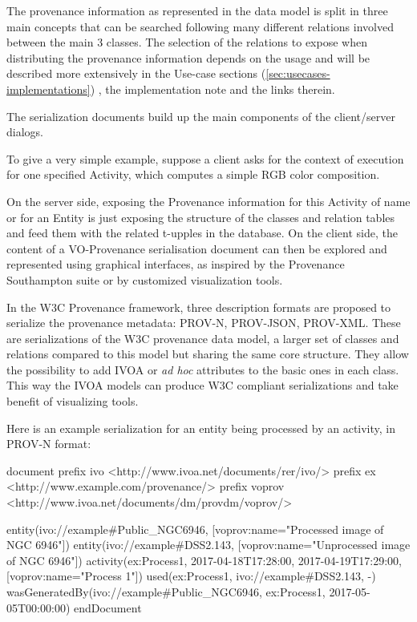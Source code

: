 
The provenance information as represented in the data model is split in three main concepts that can be searched following many different relations involved between the main 3 classes. 
The selection of the relations to expose when distributing the provenance information depends on the usage and will be described more extensively in the Use-case sections (\ref{sec:usecases-implementations}) , the implementation note \citep[]{std:ProvenanceImplementationNote} and the links therein.

The serialization documents build up the main components of the {client/server} dialogs. 

To give a very simple example, suppose a client asks for the context of execution for one specified Activity, which computes a simple RGB color composition. 

On the server side, exposing the Provenance information for this Activity of name or for an Entity is just exposing the structure of the classes and relation tables and feed them with the related t-upples in the database.
On the client side, the content of a VO-Provenance serialisation document can then be explored and represented using graphical interfaces, as inspired by the Provenance Southampton suite or by customized visualization tools.
 
In the W3C Provenance framework, three description formats are proposed to serialize the provenance metadata: {PROV-N}, {PROV-JSON}, {PROV-XML}. These are serializations of the W3C provenance data model, a larger set of classes and relations compared to this model but sharing the same core structure. They allow the possibility to add IVOA or \textit{ad hoc} attributes to the basic ones in each class. This way the IVOA models can produce W3C compliant serializations and take benefit of visualizing tools.

Here is an example serialization for an entity being processed by an activity, in PROV-N format:

\begin{verbnobox}[\scriptsize]

document
  prefix ivo <http://www.ivoa.net/documents/rer/ivo/>
  prefix ex <http://www.example.com/provenance/>
  prefix voprov <http://www.ivoa.net/documents/dm/provdm/voprov/>

  entity(ivo://example#Public_NGC6946, [voprov:name="Processed image of NGC 6946"])
  entity(ivo://example#DSS2.143, [voprov:name="Unprocessed image of NGC 6946"])
  activity(ex:Process1, 2017-04-18T17:28:00, 2017-04-19T17:29:00, [voprov:name="Process 1"])
  used(ex:Process1, ivo://example#DSS2.143, -)
  wasGeneratedBy(ivo://example#Public_NGC6946, ex:Process1, 2017-05-05T00:00:00)
endDocument

\end{verbnobox}

